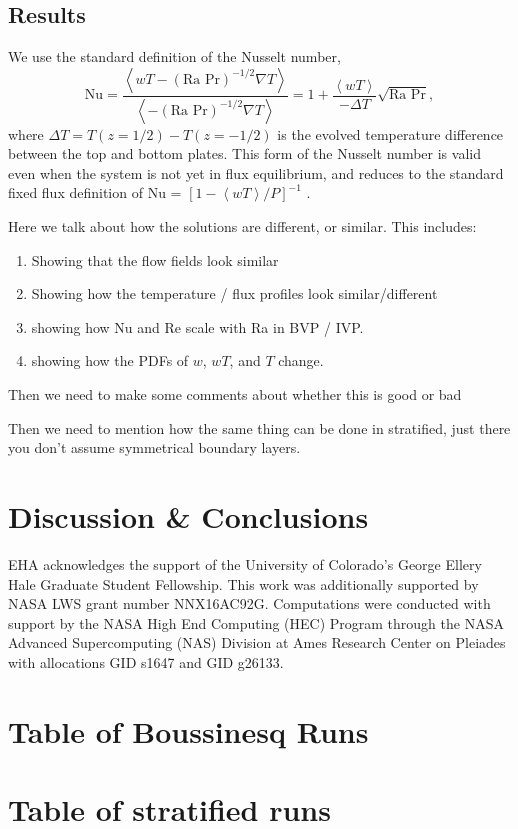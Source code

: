 \documentclass[aps, pre, onecolumn, nofootinbib, notitlepage, groupedaddress, amsfonts, amssymb, amsmath, longbibliography]{revtex4-1}
\newcommand{\angles}[1]{\ensuremath{\left\langle #1 \right\rangle}}
\newcommand{\grad}{\ensuremath{\nabla}}
\begin{document}
\subsection{Results}
We use the standard definition of the Nusselt number,
\begin{equation}
\text{Nu} = \frac{\angles{wT - (\text{Ra Pr})^{-1/2}\grad T}}{\angles{- (\text{Ra Pr})^{-1/2} \grad T}} =
1 + \frac{\angles{wT}}{-\Delta T}\sqrt{\text{Ra Pr}},
\end{equation}
where $\Delta T = T(z = 1/2) - T(z = -1/2)$ is the evolved temperature difference
between the top and bottom plates.  This form of the Nusselt number is valid even when
the system is not yet in flux equilibrium, and reduces to the standard fixed flux definition
of Nu  = $[1 - \angles{wT} / P]^{-1}$ \cite{johnston&doering2009}.

Here we talk about how the solutions are different, or similar.  This includes:
\begin{enumerate}
\item Showing that the flow fields look similar
\item Showing how the temperature / flux profiles look similar/different
\item showing how Nu and Re scale with Ra in BVP / IVP.
\item showing how the PDFs of $w$, $wT$, and $T$ change.
\end{enumerate}

Then we need to make some comments about whether this is good or bad

Then we need to mention how the same thing can be done in stratified, just there you don't
assume symmetrical boundary layers.





\section{Discussion \& Conclusions}
\label{sec:results}




\begin{acknowledgments}
EHA acknowledges the support of the University of Colorado's George 
Ellery Hale Graduate Student Fellowship.
This work was additionally supported by  NASA LWS grant number NNX16AC92G.  
Computations were conducted 
with support by the NASA High End Computing (HEC) Program through the NASA 
Advanced Supercomputing (NAS) Division at Ames Research Center on Pleiades
with allocations GID s1647 and GID g26133.
\end{acknowledgments}


\appendix
\section{Table of Boussinesq Runs}



\section{Table of stratified runs}



\end{document}
